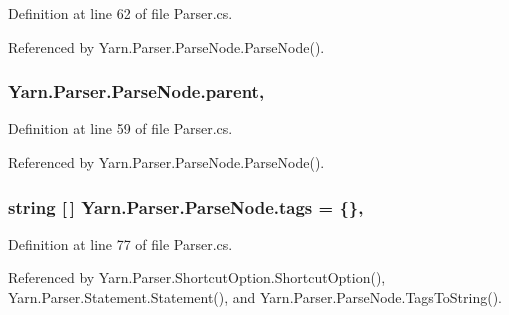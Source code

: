 Definition at line 62 of file Parser.\-cs.



Referenced by Yarn.\-Parser.\-Parse\-Node.\-Parse\-Node().

\hypertarget{a00150_af313a82103fcc2ff5a177dbb06b92f7b}{
\subsubsection[{parent}]{ Yarn.\-Parser.\-Parse\-Node.\-parent\hspace{0.3cm}{\ttfamily [package]}, {\ttfamily [inherited]}}}\label{a00150_af313a82103fcc2ff5a177dbb06b92f7b}


Definition at line 59 of file Parser.\-cs.



Referenced by Yarn.\-Parser.\-Parse\-Node.\-Parse\-Node().

\hypertarget{a00150_a58b3a15788fd2d4127d73619dc6d04ae}{
\subsubsection[{tags}]{\setlength{\rightskip}{0pt plus 5cm}string \mbox{[}$\,$\mbox{]} Yarn.\-Parser.\-Parse\-Node.\-tags = \{\}\hspace{0.3cm}{\ttfamily [package]}, {\ttfamily [inherited]}}}\label{a00150_a58b3a15788fd2d4127d73619dc6d04ae}


Definition at line 77 of file Parser.\-cs.



Referenced by Yarn.\-Parser.\-Shortcut\-Option.\-Shortcut\-Option(), Yarn.\-Parser.\-Statement.\-Statement(), and Yarn.\-Parser.\-Parse\-Node.\-Tags\-To\-String().

